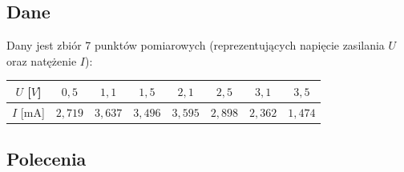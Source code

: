 \documentclass[a4paper,11pt]{article}
\begin{document}
\subsection*{Dane}

Dany jest zbiór 7 punktów pomiarowych (reprezentujących napięcie zasilania $U$ oraz natężenie $I$):

\begin{center}
\begin{tabular}{c|ccccccc}
  \toprule
  $U$ [$V$] & $0{,}5$ & $1{,}1$ & $1{,}5$ & $2{,}1$ & $2{,}5$ & $3{,}1$ & $3{,}5$ \\
  \midrule
  $I$ [$\text{mA}$] & $2{,}719$ & $3{,}637$ & $3{,}496$ & $3{,}595$ & $2{,}898$ & $2{,}362$ & $1{,}474$ \\
  \bottomrule
\end{tabular}
\end{center}

\subsection*{Polecenia}
\end{document}

